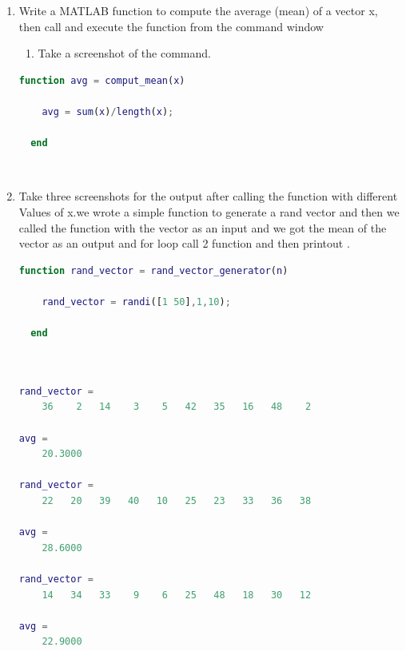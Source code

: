 \documentclass[12pt,a4paper]{article}
\begin{document}
\begin{enumerate}
\item Write a MATLAB function to compute the average (mean) of a vector x, then call and execute the function from the command window 
\begin{enumerate}
  \item Take a screenshot of the command.  
\end{enumerate}

\begin{lstlisting}[language=Matlab,style=mystyle]
  function avg = comput_mean(x)

    avg = sum(x)/length(x);

  end
\end{lstlisting}~\\[2cm]

\item  Take three screenshots for the output after calling the function with different Values of x.we wrote a simple function to generate a rand vector and then we called the function with the vector as an input and we got the mean of the vector as an output and for loop call 2 function and then printout .


\begin{lstlisting}[language=Matlab,style=mystyle]
  function rand_vector = rand_vector_generator(n)

    rand_vector = randi([1 50],1,10);

  end
  
\end{lstlisting}

\begin{lstlisting}[language=Matlab, float=h, frame=tb, label=zebra, caption={output}]

rand_vector =
    36    2   14    3    5   42   35   16   48    2

avg =
    20.3000

rand_vector =
    22   20   39   40   10   25   23   33   36   38

avg =
    28.6000

rand_vector =
    14   34   33    9    6   25   48   18   30   12

avg =
    22.9000


\end{lstlisting}
\end{enumerate}
\end{document}
